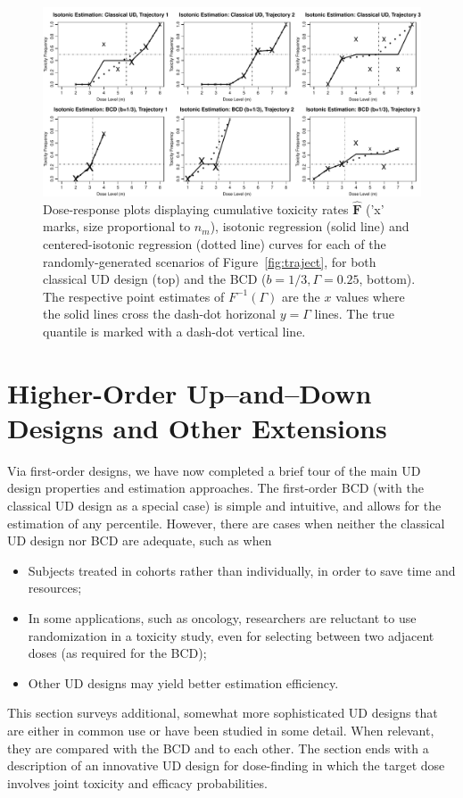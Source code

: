 \begin{figure}
\begin{center}
\includegraphics[scale=0.65]{isot}
\caption{Dose-response plots displaying cumulative toxicity rates $\mathbf{\hat{F}}$ ('x' marks, size proportional to $n_m$), isotonic regression (solid line) and centered-isotonic regression (dotted line) curves for each of the randomly-generated scenarios of Figure~\ref{fig:traject}, for both classical UD design (top) and the BCD ($b=1/3,\Gamma=0.25$, bottom). The respective point estimates of $F^{-1}(\Gamma)$ are the $x$ values where the solid lines cross the dash-dot horizonal $y=\Gamma$ lines. The true quantile is marked with a dash-dot vertical line.}\label{fig:isot}
\end{center}
\end{figure}





\section{Higher-Order Up--and--Down Designs and Other Extensions}\label{sec:extens}

Via first-order designs, we have now completed a brief tour of the main UD design properties and estimation approaches. The first-order BCD (with the classical UD design as a special case) is simple and intuitive, and allows for the estimation of any percentile. However, there are cases when neither the classical UD design nor BCD are adequate, such as when
\begin{itemize}
\item Subjects treated in cohorts rather than individually, in order to save time and resources;
\item In some applications, such as oncology, researchers are reluctant to use randomization in a toxicity study, even for selecting between two adjacent doses (as required for the BCD);
\item Other UD designs may yield better estimation efficiency.
\end{itemize}
This section surveys additional, somewhat more sophisticated UD designs that are either in common use or have been studied in some detail. When relevant, they are compared with the BCD and to each other. The section ends with a description of an innovative UD design for dose-finding in which the target dose involves joint toxicity and efficacy probabilities.

